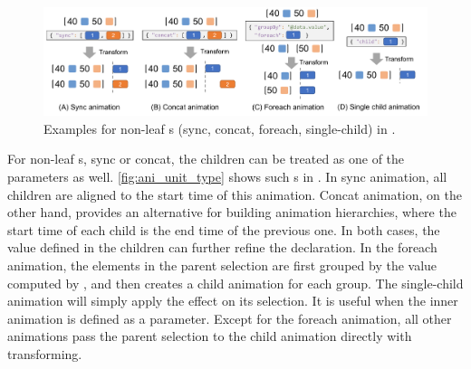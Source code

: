 \begin{figure}[h]
  \centering
  \includegraphics[width=0.9\linewidth]{figs/ani_unit_type.pdf}
  \caption{
    Examples for non-leaf \aniunit{}s (sync, concat, foreach, single-child) in \gaia{}.
  }
  \label{fig:ani_unit_type}
\end{figure}

For non-leaf \aniunit{}s, \eg sync or concat, the children can be treated as one of the parameters as well.
\autoref{fig:ani_unit_type} shows such \aniunit{}s in \gaia{}.
In sync animation, all children are aligned to the start time of this animation.
Concat animation, on the other hand, provides an alternative for building animation hierarchies, where the start time of each child is the end time of the previous one.
In both cases, the  value defined in the children can further refine the declaration.
In the foreach animation, the elements in the parent selection are first grouped by the value computed by , and then \gaia{} creates a child animation for each group.
The single-child animation will simply apply the effect on its selection.
It is useful when the inner animation is defined as a parameter.
Except for the foreach animation, all other animations pass the parent selection to the child animation directly with transforming.
